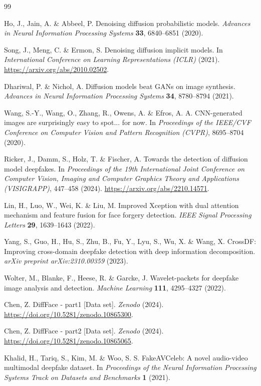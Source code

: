 \documentclass[fleqn,10pt]{wlscirep}
\begin{document}
\begin{thebibliography}{99}

 Ho, J., Jain, A. \& Abbeel, P. Denoising diffusion probabilistic models. \textit{Advances in Neural Information Processing Systems} \textbf{33}, 6840--6851 (2020).

 Song, J., Meng, C. \& Ermon, S. Denoising diffusion implicit models. In \textit{International Conference on Learning Representations (ICLR)} (2021). \url{https://arxiv.org/abs/2010.02502}.

 Dhariwal, P. \& Nichol, A. Diffusion models beat GANs on image synthesis. \textit{Advances in Neural Information Processing Systems} \textbf{34}, 8780--8794 (2021).

 Wang, S.-Y., Wang, O., Zhang, R., Owens, A. \& Efros, A. A. CNN-generated images are surprisingly easy to spot... for now. In \textit{Proceedings of the IEEE/CVF Conference on Computer Vision and Pattern Recognition (CVPR)}, 8695--8704 (2020).

 Ricker, J., Damm, S., Holz, T. \& Fischer, A. Towards the detection of diffusion model deepfakes. In \textit{Proceedings of the 19th International Joint Conference on Computer Vision, Imaging and Computer Graphics Theory and Applications (VISIGRAPP)}, 447--458 (2024). \url{https://arxiv.org/abs/2210.14571}.

 Lin, H., Luo, W., Wei, K. \& Liu, M. Improved Xception with dual attention mechanism and feature fusion for face forgery detection. \textit{IEEE Signal Processing Letters} \textbf{29}, 1639--1643 (2022).

 Yang, S., Guo, H., Hu, S., Zhu, B., Fu, Y., Lyu, S., Wu, X. \& Wang, X. CrossDF: Improving cross-domain deepfake detection with deep information decomposition. \textit{arXiv preprint arXiv:2310.00359} (2023).

 Wolter, M., Blanke, F., Heese, R. \& Garcke, J. Wavelet-packets for deepfake image analysis and detection. \textit{Machine Learning} \textbf{111}, 4295--4327 (2022).

 Chen, Z. DiffFace - part1 [Data set]. \textit{Zenodo} (2024). \url{https://doi.org/10.5281/zenodo.10865300}.

 Chen, Z. DiffFace - part2 [Data set]. \textit{Zenodo} (2024). \url{https://doi.org/10.5281/zenodo.10865065}.

 Khalid, H., Tariq, S., Kim, M. \& Woo, S. S. FakeAVCeleb: A novel audio-video multimodal deepfake dataset. In \textit{Proceedings of the Neural Information Processing Systems Track on Datasets and Benchmarks} \textbf{1} (2021).


\end{thebibliography}
\end{document}
